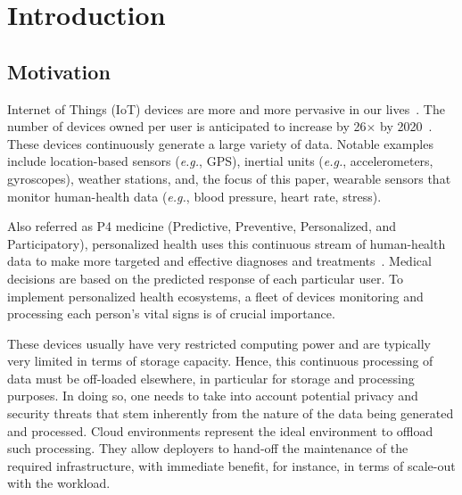 \chapter{Introduction} \label{chap:introduction}

\section{Motivation}

Internet of Things (IoT) devices are more and more pervasive in our lives~\cite{Gartner2017}.
The number of devices owned per user is anticipated to increase by 26$\times$ by 2020~\cite{Barbosa2017}.
These devices continuously generate a large variety of data.
Notable examples include location-based sensors (\emph{e.g.}, GPS), inertial units (\emph{e.g.}, accelerometers, gyroscopes), weather stations, and, the focus of this paper, wearable sensors that monitor human-health data (\emph{e.g.}, blood pressure, heart rate, stress).

Also referred as P4 medicine (Predictive, Preventive, Personalized, and Participatory), personalized health uses this continuous stream of human-health data to make more targeted and effective diagnoses and treatments~\cite{Cumming2014}. 
Medical decisions are based on the predicted response of each particular user.
To implement personalized health ecosystems, a fleet of devices monitoring and processing each person's vital signs is of crucial importance.

These devices usually have very restricted computing power and are typically very limited in terms of storage capacity.
Hence, this continuous processing of data must be off-loaded elsewhere, in particular for storage and processing purposes.
In doing so, one needs to take into account potential privacy and security threats that stem inherently from the nature of the data being generated and processed.
Cloud environments represent the ideal environment to offload such processing.
They allow deployers to hand-off the maintenance of the required infrastructure, with immediate benefit, for instance, in terms of scale-out with the workload. 

